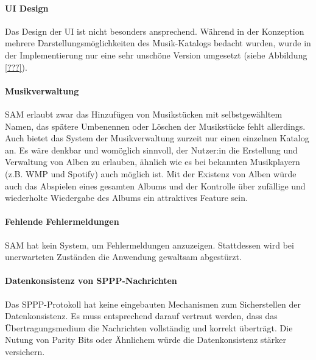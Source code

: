 \paragraph{\ac{UI} Design}
Das Design der \ac{UI} ist nicht besonders ansprechend.
Während in der Konzeption mehrere Darstellungsmöglichkeiten des Musik-Katalogs bedacht wurden, wurde in der Implementierung nur eine sehr unschöne Version umgesetzt (siehe Abbildung \ref{???}). %

\paragraph{Musikverwaltung}
\ac{SAM} erlaubt zwar das Hinzufügen von Musikstücken mit selbstgewähltem Namen, das spätere Umbenennen oder Löschen der Musikstücke fehlt allerdings.
Auch bietet das System der Musikverwaltung zurzeit nur einen einzelnen Katalog an.
Es wäre denkbar und womöglich sinnvoll, der Nutzer:in die Erstellung und Verwaltung von Alben zu erlauben, ähnlich wie es bei bekannten Musikplayern (z.B. \ac{WMP} und Spotify) auch möglich ist.
Mit der Existenz von Alben würde auch das Abspielen eines gesamten Albums und der Kontrolle über zufällige und wiederholte Wiedergabe des Albums ein attraktives Feature sein.

\paragraph{Fehlende Fehlermeldungen}
\ac{SAM} hat kein System, um Fehlermeldungen anzuzeigen.
Stattdessen wird bei unerwarteten Zuständen die Anwendung gewaltsam abgestürzt.

\paragraph{Datenkonsistenz von \ac{SPPP}-Nachrichten}
Das \ac{SPPP}-Protokoll hat keine eingebauten Mechanismen zum Sicherstellen der Datenkonsistenz.
Es muss entsprechend darauf vertraut werden, dass das Übertragungsmedium die Nachrichten vollständig und korrekt überträgt.
Die Nutung von Parity Bits oder Ähnlichem würde die Datenkonsistenz stärker versichern.

